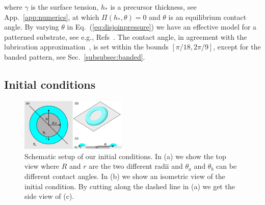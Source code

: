 \documentclass[twoside,twocolumn,9pt]{article}
\begin{document}
where $\gamma$ is the surface tension, $h_{\ast}$ is a precursor thickness, see App.~\ref{app:numerics}, at which $\Pi(h_{\ast}, \theta) = 0$ and $\theta$ is an equilibrium contact angle.
By varying $\theta$ in Eq.~(\ref{eq:disjoinpressure}) we have an effective model for a patterned substrate, see e.g., Refs~\cite{zitzLatticeBoltzmannSimulations2021, zitzControllingDewettingMorphologies2023}. 
The contact angle, in agreement with the lubrication approximation~\cite{oronLongscaleEvolutionThin1997, crasterDynamicsStabilityThin2009}, is set within the bounds $[\pi/18, 2\pi/9]$, except for the banded pattern, see Sec.~\ref{subsubsec:banded}. 

\subsection{Initial conditions}
\begin{figure}
\centering
  \includegraphics[width=0.45\textwidth]{ringrivulet_shema}
  \caption{Schematic setup of our initial conditions. In (a) we show the top view where $R$ and $r$ are the two different radii and $\theta_a$ and $\theta_b$ can be different contact angles. 
  In (b) we show an isometric view of the initial condition.
  By cutting along the dashed line in (a) we get the side view of (c).}
  \label{fig:ringschema}
\end{figure}
\end{document}
